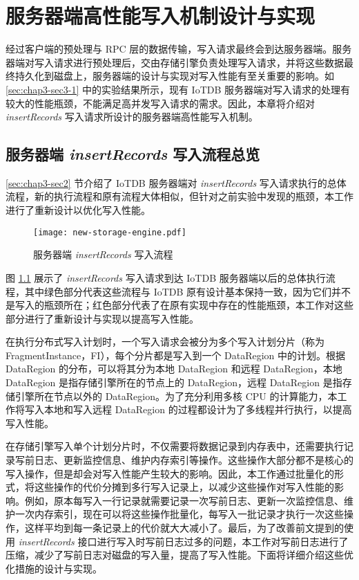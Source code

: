 
\chapter{服务器端高性能写入机制设计与实现}
经过客户端的预处理与 RPC 层的数据传输，写入请求最终会到达服务器端。服务器端对写入请求进行预处理后，交由存储引擎负责处理写入请求，并将这些数据最终持久化到磁盘上，服务器端的设计与实现对写入性能有至关重要的影响。如 \ref{sec:chap3-sec3-1} 中的实验结果所示，现有 IoTDB 服务器端对写入请求的处理有较大的性能瓶颈，不能满足高并发写入请求的需求。因此，本章将介绍对 \emph{insertRecords} 写入请求所设计的服务器端高性能写入机制。


\section{服务器端 \emph{insertRecords} 写入流程总览}
\ref{sec:chap3-sec2} 节介绍了 IoTDB 服务器端对 \emph{insertRecords} 写入请求执行的总体流程，新的执行流程和原有流程大体相似，但针对之前实验中发现的瓶颈，本工作进行了重新设计以优化写入性能。

\begin{figure}
  \centering
  \texttt{[image: new-storage-engine.pdf]}
  \caption{服务器端 \emph{insertRecords} 写入流程}
  \label{fig:iotdb-insertRecords-flow}
\end{figure}

图 \ref{fig:iotdb-insertRecords-flow} 展示了 \emph{insertRecords} 写入请求到达 IoTDB 服务器端以后的总体执行流程，其中绿色部分代表这些流程与 IoTDB 原有设计基本保持一致，因为它们并不是写入的瓶颈所在；红色部分代表了在原有实现中存在的性能瓶颈，本工作对这些部分进行了重新设计与实现以提高写入性能。


在执行分布式写入计划时，一个写入请求会被分为多个写入计划分片（称为 FragmentInstance，FI），每个分片都是写入到一个 DataRegion 中的计划。根据 DataRegion 的分布，可以将其分为本地 DataRegion 和远程 DataRegion，本地 DataRegion 是指存储引擎所在的节点上的 DataRegion，远程 DataRegion 是指存储引擎所在节点以外的 DataRegion。为了充分利用多核 CPU 的计算能力，本工作将写入本地和写入远程 DataRegion 的过程都设计为了多线程并行执行，以提高写入性能。

在存储引擎写入单个计划分片时，不仅需要将数据记录到内存表中，还需要执行记录写前日志、更新监控信息、维护内存索引等操作。这些操作大部分都不是核心的写入操作，但是却会对写入性能产生较大的影响。因此，本工作通过批量化的形式，将这些操作的代价分摊到多行写入记录上，以减少这些操作对写入性能的影响。例如，原本每写入一行记录就需要记录一次写前日志、更新一次监控信息、维护一次内存索引，现在可以将这些操作批量化，每写入一批记录才执行一次这些操作，这样平均到每一条记录上的代价就大大减小了。最后，为了改善前文提到的使用 \emph{insertRecords} 接口进行写入时写前日志过多的问题，本工作对写前日志进行了压缩，减少了写前日志对磁盘的写入量，提高了写入性能。下面将详细介绍这些优化措施的设计与实现。

